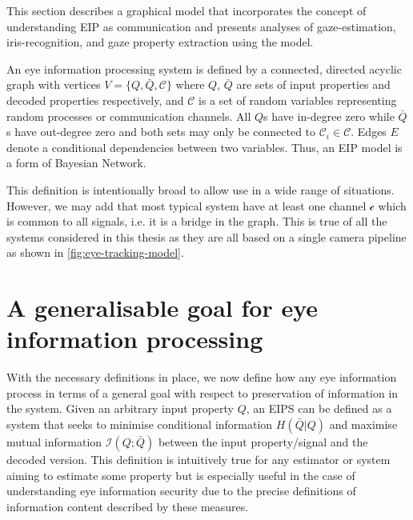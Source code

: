 This section describes a graphical model that incorporates the concept of understanding EIP as communication and presents analyses of gaze-estimation, iris-recognition, and gaze property extraction using the model.


An eye information processing system is defined by a connected, directed acyclic graph with vertices $V=\{Q, \bar{Q}, \mathcal{C}\}$ where $Q$, $\bar{Q}$ are sets of input properties and decoded properties respectively, and $\mathcal{C}$ is a set of random variables representing random processes or communication channels. All $Q$s have in-degree zero  while $\bar{Q}$s have out-degree zero and both sets may only be connected to $\mathcal{C}_i \in \mathcal{C}$. Edges $E$ denote a conditional dependencies between two variables. Thus, an EIP model is a form of Bayesian Network.

This definition is intentionally broad to allow use in a wide range of situations. However, we may add that most typical system have at least one channel $\mathcal{c}$ which is common to all signals, i.e. it is a bridge in the graph. This is true of all the systems considered in this thesis as they are all based on a single camera pipeline as shown in \cref{fig:eye-tracking-model}.



\section{A generalisable goal for eye information processing}\label{sec:gen-goals}
With the necessary definitions in place, we now define how any eye information process in terms of a general goal with respect to preservation of information in the system. Given an arbitrary input property $Q$, an EIPS can be defined as a system that seeks to minimise conditional information $H(\bar{Q}|Q)$ and maximise mutual information $\mathcal{I}(Q;\bar{Q})$ between the input property/signal and the decoded version. This definition is intuitively true for any estimator or system aiming to estimate some property but is especially useful in the case of understanding eye information security due to the precise definitions of information content described by these measures.

